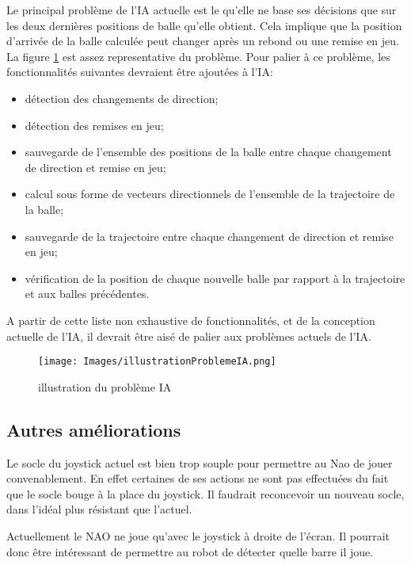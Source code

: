    \par Le principal problème de l'IA actuelle est le qu'elle ne base ses décisions que sur les deux dernières positions de balle qu'elle obtient.
    Cela implique que la position d'arrivée de la balle calculée peut changer après un rebond ou une remise en jeu.
    La figure \ref{fig:illustration du problème IA} est assez representative du problème.
    Pour palier à ce problème, les fonctionnalités suivantes devraient être ajoutées à l'IA:
    \begin{itemize}
      \item détection des changements de direction;
      \item détection des remises en jeu;
      \item sauvegarde de l'ensemble des positions de la balle entre chaque changement de direction et remise en jeu;
      \item calcul sous forme de vecteurs directionnels de l'ensemble de la trajectoire de la balle;
      \item sauvegarde de la trajectoire entre chaque changement de direction et remise en jeu;
      \item vérification de la position de chaque nouvelle balle par rapport à la trajectoire et aux balles précédentes.
    \end{itemize}
    A partir de cette liste non exhaustive de fonctionnalités, et de la conception actuelle de l'IA, il devrait être aisé de palier aux problèmes actuels de l'IA.

    \begin{figure}[!h]
      \caption{illustration du problème IA}
      \label{fig:illustration du problème IA}
      \centering
      \texttt{[image: Images/illustrationProblemeIA.png]}
    \end{figure}


  \subsection{Autres améliorations}
  \label{sub:Autres améliorations}
    \par Le socle du joystick actuel est bien trop souple pour permettre au Nao de jouer convenablement.
    En effet certaines de ses actions ne sont pas effectuées du fait que le socle bouge à la place du joystick.
    Il faudrait reconcevoir un nouveau socle, dans l'idéal plus résistant que l'actuel.

    \par Actuellement le NAO ne joue qu'avec le joystick à droite de l'écran.
    Il pourrait donc être intéressant de permettre au robot de détecter quelle barre il joue. 

